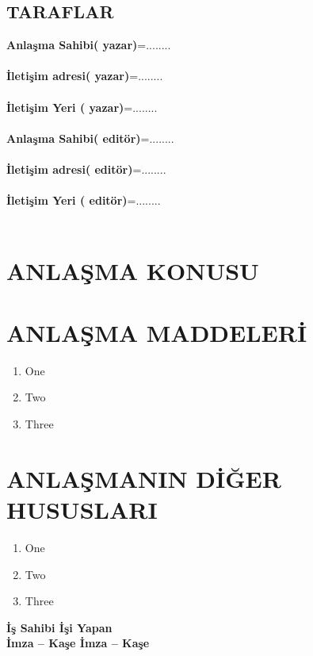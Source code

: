 \documentclass{article}
\begin{document}
\begin{flushleft}
\section{TARAFLAR  }
\textbf{Anlaşma Sahibi( yazar)}=........ \\  \\
\textbf{İletişim adresi( yazar)}=........ \\  \\
\textbf{İletişim Yeri ( yazar)}=........ \\  \\
 \vspace{2cm}
\textbf{Anlaşma Sahibi( editör)}=........ \\  \\
\textbf{İletişim adresi( editör)}=........  \\  \\
\textbf{İletişim Yeri ( editör)}=........ \\  \\
\end{flushleft}
\section{ANLAŞMA KONUSU}
\section{ANLAŞMA MADDELERİ}
\begin{enumerate}
	\item One
	\item Two
	\item Three
\end{enumerate}

\section{ANLAŞMANIN DİĞER HUSUSLARI}
\begin{enumerate}
	\item One
	\item Two
	\item Three
\end{enumerate} 
 
 \vspace{2cm}
\textbf{İş Sahibi İşi Yapan} \\

\textbf{İmza – Kaşe İmza – Kaşe }
\end{document}
